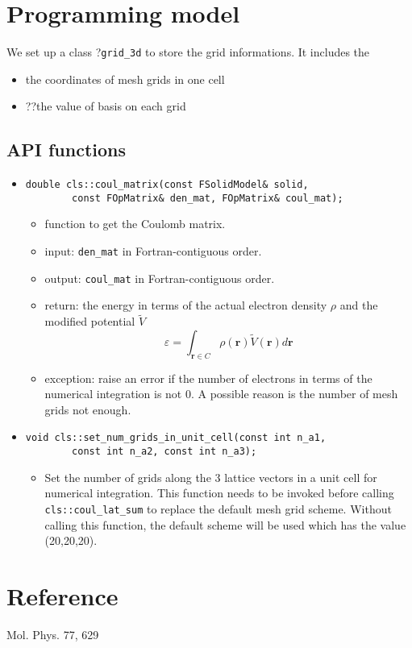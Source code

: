 \documentclass{article}
\begin{document}
\section{Programming model}
We set up a class ?\verb$grid_3d$ to store the
grid informations. It includes the
\begin{itemize}
  \item the coordinates of mesh grids in one cell
  \item ??the value of basis on each grid
\end{itemize}

\subsection{API functions}
\begin{itemize}
\item
\begin{verbatim}
double cls::coul_matrix(const FSolidModel& solid,
        const FOpMatrix& den_mat, FOpMatrix& coul_mat);
\end{verbatim}
\begin{itemize}
  \item function to get the Coulomb matrix.
  \item input: \verb$den_mat$ in Fortran-contiguous order.
  \item output: \verb$coul_mat$ in Fortran-contiguous order.
  \item return: the energy in terms of the actual electron density $\rho$ and
    the modified potential $\tilde{V}$
    \begin{equation}
      \varepsilon = \int_{\mathbf{r}\in C} \rho(\mathbf{r})\tilde{V}(\mathbf{r}) d\mathbf{r}
      \label{}
    \end{equation}
  \item exception: raise an error if the number of electrons in terms of the
    numerical integration is not 0.  A possible reason is the number of
    mesh grids not enough.
\end{itemize}
%
\item 
\begin{verbatim}
void cls::set_num_grids_in_unit_cell(const int n_a1,
        const int n_a2, const int n_a3);
\end{verbatim}
\begin{itemize}
  \item Set the number of grids along the 3 lattice vectors in a unit cell for
    numerical integration.
    This function needs to be invoked before calling \verb$cls::coul_lat_sum$
    to replace the default mesh grid scheme.
    Without calling this function, the default scheme will be used which has
    the value (20,20,20).
\end{itemize}
\end{itemize}

\section{Reference}
Mol. Phys. 77, 629
\end{document}
